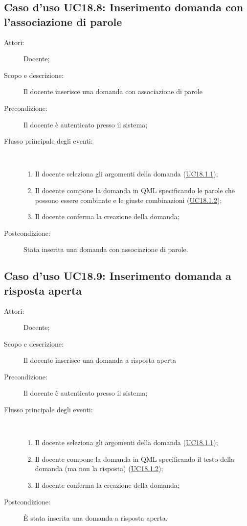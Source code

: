 \subsection{Caso d'uso UC18.8: Inserimento domanda con l'associazione di parole}\begin{description}
	\item[Attori:] Docente;
	\item[Scopo e descrizione:] Il docente inserisce una domanda con associazione di parole
	\item[Precondizione:] Il docente è autenticato presso il sistema;
	
	\item[Flusso principale degli eventi:] \ 
	\begin{enumerate}
		\item Il docente seleziona gli argomenti della domanda (\hyperlink{UC18.1.1}{UC18.1.1});
		\item Il docente compone la domanda in QML specificando le parole che possono essere combinate e le giuste combinazioni (\hyperlink{UC18.1.2}{UC18.1.2});
		\item Il docente conferma la creazione della domanda;
		
	\end{enumerate}
	\item[Postcondizione:] Stata inserita una domanda con associazione di parole.
\end{description}
\hypertarget{UC18.9}{}
\subsection{Caso d'uso UC18.9: Inserimento domanda a risposta aperta}\begin{description}
	\item[Attori:] Docente;
	\item[Scopo e descrizione:] Il docente inserisce una domanda a risposta aperta
	\item[Precondizione:] Il docente è autenticato presso il sistema;
	
	\item[Flusso principale degli eventi:] \ 
	\begin{enumerate}
		\item Il docente seleziona gli argomenti della domanda (\hyperlink{UC18.1.1}{UC18.1.1});
		\item Il docente compone la domanda in QML specificando il testo della domanda (ma non la risposta) (\hyperlink{UC18.1.2}{UC18.1.2});
		\item Il docente conferma la creazione della domanda;
		
	\end{enumerate}
	\item[Postcondizione:] È stata inserita una domanda a risposta aperta.
\end{description}
\hypertarget{UC18.10}{}
